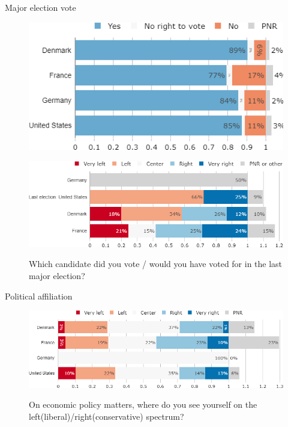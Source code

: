 \documentclass[aspectratio=169,9pt,dvipsnames]{beamer}
\begin{document}
\begin{frame}{Major election vote}%
\vspace{-.5cm}
\begin{figure}[h!]
\caption{Did you vote in the last major election?}
\includegraphics[width=.4\textwidth]{../figures/country_comparison/vote_participation_countries.png} \\
\vspace{.1cm}
\caption{Which candidate did you vote / would you have voted for in the last major election?}
\includegraphics[width=.6\textwidth]{../figures/country_comparison/vote_countries.png} \\
\end{figure}
\end{frame}


\begin{frame}{Political affiliation}%
\vspace{-.5cm}
\begin{figure}[h!]
\caption{On economic policy matters, where do you see yourself on the left(liberal)/right(conservative) spectrum?}
\includegraphics[width=.8\textwidth]{../figures/country_comparison/left_right_countries.png} \\
\end{figure}
\end{frame}
\end{document}
